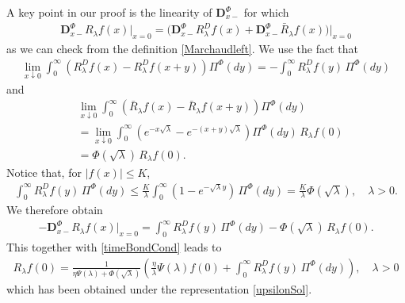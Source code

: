\documentclass[11pt,a4paper]{article}
\theoremstyle{plain}
\theoremstyle{definition}
\theoremstyle{remark}
\begin{document}
		A key point in our proof is the linearity of $\mathbf{D}_{x-}^\Phi$ for which 
		\begin{align*}
			\mathbf{D}_{x-}^\Phi R_\lambda f(x) \big\vert_{x=0} = \big(\mathbf{D}_{x-}^\Phi R_\lambda^D f(x) + \mathbf{D}_{x-}^\Phi \bar{R}_\lambda f(x)\big)\big\vert_{x=0}
		\end{align*}
		as we can check from the definition \eqref{Marchaudleft}. We use the fact that
		\begin{align*}
			\lim_{x\downarrow 0}  \int_0^\infty \left( R^D_\lambda f(x) - R^D_\lambda f(x+y) \right) \Pi^\Phi(dy) = - \int_0^\infty R^D_\lambda f(y)\, \Pi^\Phi(dy)
		\end{align*}
		and
		\begin{align*}
			&\lim_{x\downarrow 0}  \int_0^\infty \left( \bar{R}_\lambda f(x) - \bar{R}_\lambda f(x+y) \right) \Pi^\Phi(dy) \\
			&=  \lim_{x\downarrow 0}  \int_0^\infty \left( e^{-x \sqrt{\lambda}} - e^{-(x+y) \sqrt{\lambda}} \right) \Pi^\Phi(dy)\, R_\lambda f(0)\\
			&= \Phi(\sqrt{\lambda})\, R_\lambda f(0).
		\end{align*}
		Notice that, for $\vert f(x) \vert \leq K$, 
		\begin{align*}
			\int_0^\infty R^D_\lambda f(y)\, \Pi^\Phi(dy)\leq \frac{K}{\lambda}  \int_0^\infty (1-e^{- \sqrt{\lambda} y}) \, \Pi^\Phi(dy)= \frac{K}{\lambda} \Phi(\sqrt{\lambda}), \quad \lambda >0.
		\end{align*}
		We therefore obtain
		\begin{align*}
			- \mathbf{D}_{x-}^\Phi R_\lambda f(x) \big\vert_{x=0} = \int_0^\infty R^D_\lambda f(y)\, \Pi^\Phi(dy) - \Phi(\sqrt{\lambda})\, R_\lambda f(0).
		\end{align*}
		This together with \eqref{timeBondCond} leads to
		\begin{align}
			\label{BCresolvent2}
			R_\lambda f(0) =\frac{1}{\eta \Psi(\lambda) +\Phi(\sqrt \lambda)} \left( \frac{\eta}{\lambda} \Psi(\lambda)f(0)+ \int_0^\infty R_\lambda^D f(y) \, \Pi^\Phi(dy) \right), \quad \lambda>0
		\end{align}
		which has been obtained under the representation \eqref{upsilonSol}.\\
		
\end{document}
